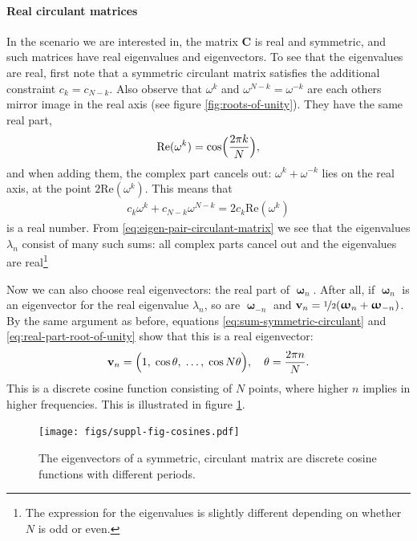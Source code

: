 \documentclass[a4paper, fontsize=9pt, twocolumn]{scrreprt}
\newcommand{\vect}[1]{\mathrm{\mathbf{#1}}}
\newcommand{\vv}{\vect v}
\newcommand{\vC}{\vect C}
\newcommand{\vomega}{\boldsymbol{\upomega}}
\newcommand{\Real}{\text{Re}}
\begin{document}
\paragraph{Real circulant matrices}

In the scenario we are interested in, the matrix $\vC$ is real and symmetric, and such matrices have real eigenvalues and eigenvectors.
To see that the eigenvalues are real, first note that a symmetric circulant matrix satisfies the additional constraint $c_k = c_{N-k}$.
Also observe that $\omega^k$ and $\omega^{N-k} = \omega^{-k}$ are each others mirror image in the real axis (see figure \ref{fig:roots-of-unity}).
They have the same real part,
\begin{equation}
    \label{eq:real-part-root-of-unity}
    \Real(\omega^k) = \cos\Bigl( \frac{2\pi k}{N}\Bigr),
\end{equation}
and when adding them, the complex part cancels out: $\omega^k + \omega^{-k}$ lies on the real axis, at the point $2 \Real(\omega^k)$.
This means that
\begin{align}
    \label{eq:sum-symmetric-circulant}
    c_k \omega^k + c_{N-k} \omega^{N-k}
        = 2c_k \Real(\omega^k)
\end{align}
is a real number.
From \eqref{eq:eigen-pair-circulant-matrix} we see that the eigenvalues $\lambda_n$ consist of many such sums: all complex parts cancel out and the eigenvalues are real\footnote{The expression for the eigenvalues is slightly different depending on whether $N$ is odd or even.}


Now we can also choose real eigenvectors: the real part of $\vomega_n$. 
After all, if $\vomega_n$ is an eigenvector for the real eigenvalue $\lambda_n$, so are $\vomega_{-n}$ and $\vv_n = \nicefrac{1}{2}( \vomega_n + \vomega_{-n})$.
By the same argument as before, equations \eqref{eq:sum-symmetric-circulant} and \eqref{eq:real-part-root-of-unity} show that this is a real eigenvector:
\begin{align}
    \vv_n = \Bigl(1, \; \cos \theta, \; \dots, \; \cos N\theta\Bigr), 
    \quad \theta = \frac{2\pi n}{N}.
\end{align}
This is a discrete cosine function consisting of $N$ points, where higher $n$ implies in higher frequencies.
This is illustrated in figure \ref{fig:eigenvectors-symmetric-circulant}.


\begin{figure}
    \centering
    \texttt{[image: figs/suppl-fig-cosines.pdf]}
    \caption{The eigenvectors of a symmetric, circulant matrix are discrete cosine functions with different periods.}
    \label{fig:eigenvectors-symmetric-circulant}
\end{figure}
\end{document}
